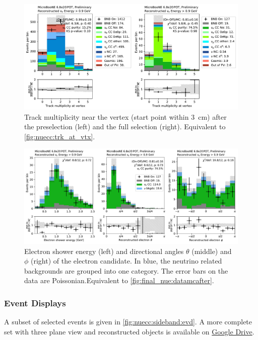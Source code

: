 \begin{figure}[htb] 
    \centering
    \includegraphics[height=0.27\textheight]{Sidebands/Figures/nuecc/run123/event_trk_at_vtx.pdf}
\caption{\label{fig:nuecc:sideband:trk_vtx} Track multiplicity near the vertex (start point within \SI{3}{\cm}) after the preselection (left) and the full \nuecc selection (right). Equivalent to \cref{fig:nuecc:trk_at_vtx}.}
\end{figure}

\begin{figure}[htb] 
    \centering
    \includegraphics[height=0.27\textheight]{Sidebands/Figures/nuecc/run123/event_e_kinematics.pdf}
\caption{\label{fig:nuecc:sideband:e_kinematics} Electron shower energy (left) and directional angles $\theta$ (middle) and $\phi$ (right) of the \nuecc electron candidate. In blue, the neutrino related backgrounds are grouped into one category. The error bars on the data are Poissonian.Equivalent to \cref{fig:final_nue:datamcafter}.}
\end{figure}

\subsubsection{Event Displays}

A subset of selected events is given in \cref{fig:nuecc:sideband:evd}. A more complete set with three plane view and reconstructed objects is available on \href{https://drive.google.com/drive/folders/1_zV1V4MbLB0MO1aP-VNPCGC1d0QatSU8?usp=sharing}{Google Drive}.

